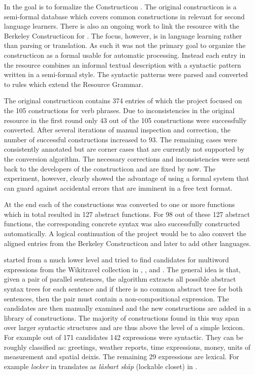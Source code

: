 \documentclass[output=paper]{langsci/langscibook}
\begin{document}
In \cite{gruzitis2015formalising} the goal is to formalize the
 Constructicon \citep{konvens:lyngfelt12w}. 
The original constructicon is a semi-formal 
database which covers common constructions in  relevant for
second language learners. There is also an ongoing work to link 
the resource with the Berkeley Constructicon for  \citep{backstrom}. The focus,
however, is in language learning rather than parsing or translation.
As such it was not the primary goal to organize the constructicon as
a formal  usable for automatic processing. Instead each entry
in the resource combines an informal textual description with 
a syntactic pattern written in a semi-formal style. 
The syntactic patterns were parsed and converted to  rules
which extend the  Resource Grammar.

The original constructicon contains 374 entries of which the project
focused on the 105 constructions for verb phrases. Due to inconsistencies
in the original resource in the first round only 43 out of 
the 105 constructions were successfully converted. 
After several iterations of manual inspection and correction, 
the number of successful constructions increased to 93. The remaining
cases were consistently annotated but are corner cases that are currently
not supported by the conversion algorithm. The necessary corrections
and inconsistencies were sent back to the developers of the constructicon
and are fixed by now. The experiment, however, clearly showed the advantage
of using a formal system that can guard against accidental errors
that are imminent in a free text format.

At the end each of the constructions was converted to one or 
more  functions which in total resulted in 127 abstract functions. 
For 98 out of these 127 abstract functions, the corresponding 
concrete syntax was also successfully constructed automatically.
A logical continuation of the project would be to also convert the
aligned entries from the Berkeley Constructicon and later
to add other languages.

\cite{enache2014handling} started from a much lower level and tried
to find candidates for multiword expressions from 
the Wikitravel  collection
in , ,  and . The general idea is that,
given a pair of parallel sentences, the algorithm extracts all
possible abstract syntax trees for each sentence and if there
is no common abstract tree for both sentences, then the pair must
contain a non-compositional expression. The candidates are then
manually examined and the new constructions are added in a library
of constructions. The majority of constructions found in this way
span over larger syntactic structures and are thus above the level of
a simple lexicon. For example out of 171 candidates 142 expressions
were syntactic. They can be roughly classified as: greetings, weather
reports, time expressions, money, units of measurement and spatial deixis.
The remaining 29 expressions are lexical. For example \textit{locker}
in  translates as \textit{l{\aa}sbart sk{\aa}p} (lockable closet)
in .
\end{document}
